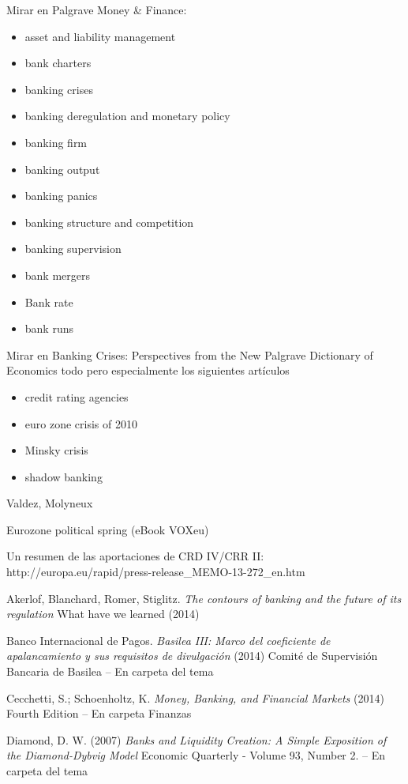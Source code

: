 \documentclass{nuevotema}
\begin{document}
Mirar en Palgrave Money \& Finance:

\begin{itemize}
	\item asset and liability management
	\item bank charters
	\item banking crises
	\item banking deregulation and monetary policy
	\item banking firm
	\item banking output
	\item banking panics
	\item banking structure and competition
	\item banking supervision
	\item bank mergers
	\item Bank rate
	\item bank runs
\end{itemize}

Mirar en Banking Crises: Perspectives from the New Palgrave Dictionary of Economics todo pero especialmente los siguientes artículos
\begin{itemize}
	\item credit rating agencies
	\item euro zone crisis of 2010
	\item Minsky crisis
	\item shadow banking
\end{itemize}

Valdez, Molyneux

Eurozone political spring (eBook VOXeu)

Un resumen de las aportaciones de CRD IV/CRR II: http://europa.eu/rapid/press-release\_MEMO-13-272\_en.htm

Akerlof, Blanchard, Romer, Stiglitz. \textit{The contours of banking and the future of its regulation} What have we learned (2014)

Banco Internacional de Pagos. \textit{Basilea III: Marco del coeficiente de apalancamiento y sus requisitos de divulgación} (2014) Comité de Supervisión Bancaria de Basilea -- En carpeta del tema

Cecchetti, S.; Schoenholtz, K. \textit{Money, Banking, and Financial Markets} (2014) Fourth Edition -- En carpeta Finanzas

Diamond, D. W. (2007) \textit{Banks and Liquidity Creation: A Simple Exposition of the Diamond-Dybvig Model} Economic Quarterly - Volume 93, Number 2. -- En carpeta del tema 
\end{document}
